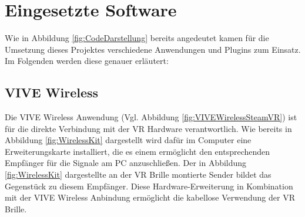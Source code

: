 \section{Eingesetzte Software}\label{sec:Software}
Wie in Abbildung \ref{fig:CodeDarstellung} bereits angedeutet kamen für die Umsetzung dieses Projektes verschiedene Anwendungen und Plugins zum Einsatz. Im Folgenden werden diese genauer erläutert:

\subsection{VIVE Wireless}\label{sec:VIVEWireless}
Die VIVE Wireless Anwendung (Vgl. Abbildung \ref{fig:VIVEWirelessSteamVR}) ist für die direkte Verbindung mit der VR Hardware verantwortlich. Wie bereits in Abbildung \ref{fig:WirelessKit} dargestellt wird dafür im Computer eine Erweiterungskarte installiert, die es einem ermöglicht den entsprechenden Empfänger für die Signale am PC anzuschließen. Der in Abbildung \ref{fig:WirelessKit} dargestellte an der VR Brille montierte Sender bildet das Gegenstück zu diesem Empfänger. Diese Hardware-Erweiterung in Kombination mit der VIVE Wireless Anbindung ermöglicht die kabellose Verwendung der VR Brille.


